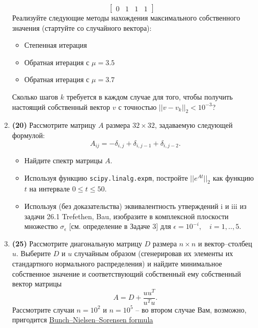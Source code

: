 \documentclass[prb,papersize=a4paper,notitlepage]{revtex4-1}%
\begin{document}
\begin{enumerate}
$$\begin{bmatrix}
0 & 1 & 1 & 1
\end{bmatrix}\quad
$$
Реализуйте следующие методы нахождения максимального собственного значения (стартуйте со случайного вектора):
\begin{itemize}
\item Степенная итерация
\item Обратная итерация с $\mu = 3.5$
\item Обратная итерация с $\mu = 3.7$
\end{itemize}
Сколько шагов $k$ требуется в каждом случае для того, чтобы получить настоящий собственный вектор $v$ с точностью $||v-v_k||_2 < 10^{-3}$?
\item \textbf{(20)} Рассмотрите матрицу $A$ размера $32\times 32$, задаваемую следующей формулой:
$$
A_{ij} = -\delta_{i,j} + \delta_{i, j-1} + \delta_{i, j-2}.
$$
\begin{itemize}
\item Найдите спектр матрицы $A$.
\item Используя функцию \lstinline{scipy.linalg.expm}, постройте $||e^{At}||_2$ как функцию $t$ на интервале $0\le t \le 50$.
\item Используя (без доказательства) эквивалентность утверждений i и iii из задачи 26.1 Trefethen, Bau, изобразите в комплексной плоскости множество $\sigma_\epsilon$ [см. определение в Задаче 3] для $\epsilon = 10^{-i},\quad i=1,..,5$.
\end{itemize}
\item \textbf{(25)} Рассмотрите диагональную матрицу $D$ размера $n\times n$ и вектор--столбец $u$. Выберите $D$ и $u$ случайным образом (сгенерировав их элементы их стандартного нормального распределения) и найдите минимальное собственное значение и соответствующий собственный ему собственный вектор матрицы
$$A = D + \frac{u u^T}{u^T u}.$$ Рассмотрите случаи $n=10^2$ и $n=10^5$ -- во втором случае Вам, возможно, пригодится \href{https://en.wikipedia.org/wiki/Bunch%E2%80%93Nielsen%E2%80%93Sorensen_formula}{Bunch--Nielsen--Sorensen formula}
\end{enumerate}
\end{document}
